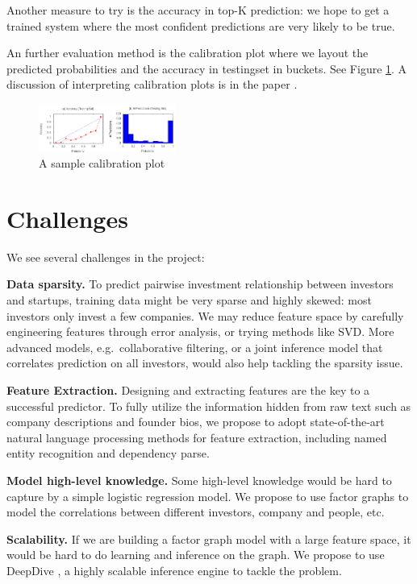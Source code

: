 Another measure to try is the accuracy in top-K prediction: we hope to
get a trained system where the most confident predictions are very
likely to be true.

An further evaluation method is the calibration plot where we layout the
predicted probabilities and the accuracy in testingset in buckets. See
Figure \ref{fig:calibration}. A discussion of interpreting calibration
plots is in the paper \cite{zhang2014feature}.

\begin{figure}[ht!]
\centering
\includegraphics[width=0.4\textwidth]{img/calibration.png}
\caption{A sample calibration plot}
\label{fig:calibration}
\end{figure}

\section{Challenges}\label{challenges}

We see several challenges in the project:

\textbf{Data sparsity.} To predict pairwise investment relationship
between investors and startups, training data might be very sparse and
highly skewed: most investors only invest a few companies. We may reduce
feature space by carefully engineering features through error analysis,
or trying methods like SVD. More advanced models, e.g.~collaborative
filtering, or a joint inference model that correlates prediction on all
investors, would also help tackling the sparsity issue.

\textbf{Feature Extraction.} Designing and extracting features are the
key to a successful predictor. To fully utilize the information hidden
from raw text such as company descriptions and founder bios, we propose
to adopt state-of-the-art natural language processing methods for
feature extraction, including named entity recognition and dependency
parse.

\textbf{Model high-level knowledge.} Some high-level knowledge would be
hard to capture by a simple logistic regression model. We propose to use
factor graphs to model the correlations between different investors,
company and people, etc.

\textbf{Scalability.} If we are building a factor graph model with a
large feature space, it would be hard to do learning and inference on
the graph. We propose to use DeepDive \cite{zhang2014feature}, a highly
scalable inference engine to tackle the problem.

